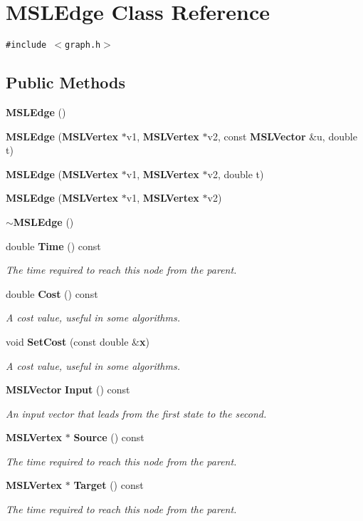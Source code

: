 \section{MSLEdge  Class Reference}
\label{classMSLEdge}
{\tt \#include $<$graph.h$>$}

\subsection*{Public Methods}
\begin{CompactItemize}
\item 
{\bf MSLEdge} ()
\item 
{\bf MSLEdge} ({\bf MSLVertex} $\ast$v1, {\bf MSLVertex} $\ast$v2, const {\bf MSLVector} \&u, double t)
\item 
{\bf MSLEdge} ({\bf MSLVertex} $\ast$v1, {\bf MSLVertex} $\ast$v2, double t)
\item 
{\bf MSLEdge} ({\bf MSLVertex} $\ast$v1, {\bf MSLVertex} $\ast$v2)
\item 
{\bf $\sim$MSLEdge} ()
\item 
double {\bf Time} () const
\begin{CompactList}\small\item\em The time required to reach this node from the parent.\item\end{CompactList}\item 
double {\bf Cost} () const
\begin{CompactList}\small\item\em A cost value, useful in some algorithms.\item\end{CompactList}\item 
void {\bf Set\-Cost} (const double \&{\bf x})
\begin{CompactList}\small\item\em A cost value, useful in some algorithms.\item\end{CompactList}\item 
{\bf MSLVector} {\bf Input} () const
\begin{CompactList}\small\item\em An input vector that leads from the first state to the second.\item\end{CompactList}\item 
{\bf MSLVertex} $\ast$ {\bf Source} () const
\begin{CompactList}\small\item\em The time required to reach this node from the parent.\item\end{CompactList}\item 
{\bf MSLVertex} $\ast$ {\bf Target} () const
\begin{CompactList}\small\item\em The time required to reach this node from the parent.\item\end{CompactList}\end{CompactItemize}
